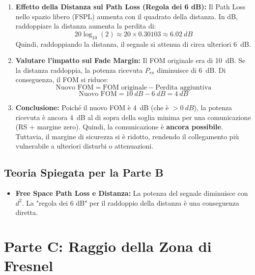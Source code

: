 \begin{enumerate}[label=\textbf{Step \arabic*:}, wide, labelwidth=!, labelindent=0pt]
    \item \textbf{Effetto della Distanza sul Path Loss (Regola dei 6 dB):}
    Il Path Loss nello spazio libero (FSPL) aumenta con il quadrato della distanza. In dB, raddoppiare la distanza aumenta la perdita di:
    \begin{equation}
        20 \log_{10}(2) \approx 20 \times 0.30103 \approx \SI{6.02}{dB}
    \end{equation}
    Quindi, raddoppiando la distanza, il segnale si attenua di circa ulteriori \SI{6}{dB}.

    \item \textbf{Valutare l'impatto sul Fade Margin:}
    Il FOM originale era di \SI{10}{dB}. Se la distanza raddoppia, la potenza ricevuta $P_{rx}$ diminuisce di \SI{6}{dB}. Di conseguenza, il FOM si riduce:
    \begin{equation}
        \text{Nuovo FOM} = \text{FOM originale} - \text{Perdita aggiuntiva}
    \end{equation}
    \begin{equation}
        \text{Nuovo FOM} = \SI{10}{dB} - \SI{6}{dB} = \SI{4}{dB}
    \end{equation}

    \item \textbf{Conclusione:}
    Poiché il nuovo FOM è \SI{4}{dB} (che è $> \SI{0}{dB}$), la potenza ricevuta è ancora \SI{4}{dB} al di sopra della soglia minima per una comunicazione (RS + margine zero).
    Quindi, la comunicazione è \textbf{ancora possibile}. Tuttavia, il margine di sicurezza si è ridotto, rendendo il collegamento più vulnerabile a ulteriori disturbi o attenuazioni.
\end{enumerate}

\subsection*{Teoria Spiegata per la Parte B}
\begin{itemize}
    \item \textbf{Free Space Path Loss e Distanza:} La potenza del segnale diminuisce con $d^2$. La "regola dei 6 dB" per il raddoppio della distanza è una conseguenza diretta.
\end{itemize}

\section{Parte C: Raggio della Zona di Fresnel}

